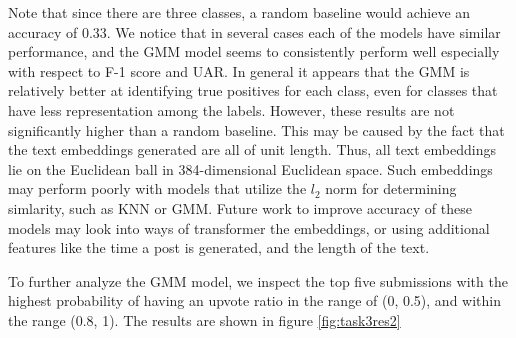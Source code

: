 \documentclass[11pt,a4paper]{article}
\begin{document}
    Note that since there are three classes, a random baseline would achieve an accuracy of 0.33. We notice that in several cases each of the models have similar performance, and the GMM model seems to consistently perform well especially with respect to F-1  score and UAR. In general it appears that the GMM is relatively better at identifying true positives for each class, even for classes that have less representation among the labels. However, these results are not significantly higher than a random baseline. This may be caused by the fact that the text embeddings generated are all of unit length. Thus, all text embeddings lie on the Euclidean ball in 384-dimensional Euclidean space. Such embeddings may perform poorly with models that utilize the $l_2$ norm for determining simlarity, such as KNN or GMM. Future work to improve accuracy of these models may look into ways of transformer the embeddings, or using additional features like the time a post is generated, and the length of the text.

    To further analyze the GMM model, we inspect the top five submissions with the highest probability of having an upvote ratio in the range of (0, 0.5), and within the range (0.8, 1). The results are shown in figure \ref{fig:task3res2}
\end{document}
